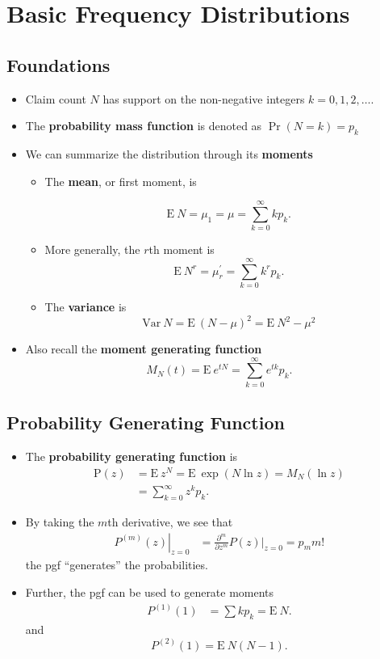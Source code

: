 \documentclass[]{book}
\begin{document}
\section{Basic Frequency
Distributions}\label{basic-frequency-distributions}

\subsection{Foundations}\label{foundations}

\begin{itemize}
\item
  Claim count \(N\) has support on the non-negative integers
  \(k=0,1,2, \ldots\).
\item
  The \textbf{probability mass function} is denoted as
  \(\Pr(N = k) = p_k\)
\item
  We can summarize the distribution through its \textbf{moments}

  \begin{itemize}
  \item
    The \textbf{mean}, or first moment, is

    \[\mathrm{E~} N = \mu_1 = \mu = \sum^{\infty}_{k=0} k p_k .\]
  \item
    More generally, the \(r\)th moment is
    \[\mathrm{E~} N^r = \mu_r^{\prime} = \sum^{\infty}_{k=0} k^r p_k .\]
  \item
    The \textbf{variance} is
    \[\mathrm{Var~} N = \mathrm{E~} (N-\mu)^2 = \mathrm{E~} N^2 - \mu^2\]
  \end{itemize}
\item
  Also recall the \textbf{moment generating function}
  \[M_N(t) = \mathrm{E~}e^{tN} = \sum^{\infty}_{k=0} e^{tk} p_k .\]
\end{itemize}

\subsection{Probability Generating
Function}\label{probability-generating-function}

\begin{itemize}
\item
  The \textbf{probability generating function} is \[\begin{aligned}
  \mathrm{P}(z) &= \mathrm{E~}z^N = \mathrm{E~}\exp{(N \ln z)} = M_N(\ln{z})\\
  &= \sum^{\infty}_{k=0} z^k p_k .\end{aligned}\]
\item
  By taking the \(m\)th derivative, we see that \[\begin{aligned}
  \left. P^{(m)}(z)\right|_{z=0} &= \frac{\partial^m }{\partial z^m} P(z)|_{z=0} = p_m m!\end{aligned}\]
  the pgf ``generates'' the probabilities.
\item
  Further, the pgf can be used to generate moments \[\begin{aligned}
  P^{(1)}(1) &= \sum k p_k = \mathrm{E~}N .\end{aligned}\] and
  \[P^{(2)}(1) = \mathrm{E~}N(N-1).\]
\end{itemize}
\end{document}
